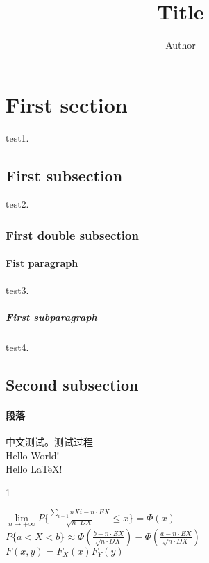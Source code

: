 \documentclass[UTF8]{article}
\title {Title}
\author {Author}
\begin{document}
\maketitle
\section{First section} test1.
    \subsection{First subsection} test2.
        \subsubsection{First double subsection}
            \paragraph{Fist paragraph} test3.
                \subparagraph{First subparagraph} test4.
    \subsection{Second subsection}
        \paragraph{段落} 中文测试。测试过程
\\
Hello World! \\ %
Hello \LaTeX ! \\
\begin{description}
  \item[1]
\end{description}
$\lim\limits_{n \rightarrow +\infty} P\lbrace\frac{\sum\limits_{i=1}{n}Xi - n\cdot EX}{ \sqrt{n \cdot DX} }  \leqslant x\rbrace = \Phi(x)$ \\

$P\lbrace a<X<b \rbrace \approx \Phi(\frac{b - n\cdot EX}{\sqrt {n\cdot DX}}) - \Phi(\frac{a - n\cdot EX}{\sqrt{n\cdot DX} })$ \\

$F(x,y) = F_{X}(x)F_{Y}(y)$
\end{document}
